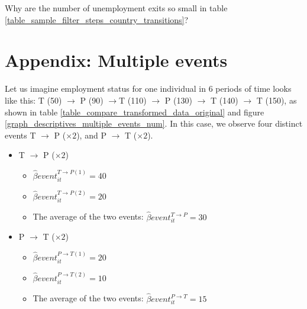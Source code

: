 \begin{table}
    \caption{Why are the number of unemployment exits so small in table \ref{table_sample_filter_steps_country_transitions}?}
    \centering
    \resizebox{\textwidth}{!}{}
    \label{table_sample_unmp_steps_contyp}
\end{table}


\clearpage
\section{Appendix: Multiple events}\label{sec:multiple}
\setcounter{figure}{0}    
\setcounter{table}{0}    
\renewcommand*\thetable{\Alph{section}.\arabic{table}}
\renewcommand*\thefigure{\Alph{section}.\arabic{figure}}
\renewcommand{\theHfigure}{\Alph{section}.\arabic{table}}
\renewcommand{\theHtable}{\Alph{section}.\arabic{figure}}

Let us imagine employment status for one individual in 6 periods of time looks like this: T (50) $\rightarrow$ P (90) $\rightarrow$T (110) $\rightarrow$ P (130) $\rightarrow$ T (140) $\rightarrow$ T (150), as shown in table \ref{table_compare_transformed_data_original} and figure \ref{graph_descriptives_multiple_events_num}.  In this case, we observe four distinct events T $\rightarrow$ P ($\times 2$), and P $\rightarrow$ T ($\times 2$).  

\begin{itemize} 
    \item T $\rightarrow$ P ($\times 2$)
    \begin{itemize} 
        \item $\hat{\beta} event^{T \rightarrow P (1)}_{it} = 40$ 
        \item $\hat{\beta} event^{T \rightarrow P (2)}_{it} = 20$
        \item The average of the two events: $\hat{\beta} event^{T \rightarrow P}_{it} = 30$
    \end{itemize}
    \item P $\rightarrow$ T ($\times 2$)
    \begin{itemize} 
        \item $\hat{\beta} event^{P \rightarrow T (1)}_{it} = 20$
        \item $\hat{\beta} event^{P \rightarrow T (2)}_{it} = 10$
        \item The average of the two events: $\hat{\beta} event^{P \rightarrow T}_{it} = 15$
    \end{itemize}
\end{itemize}

